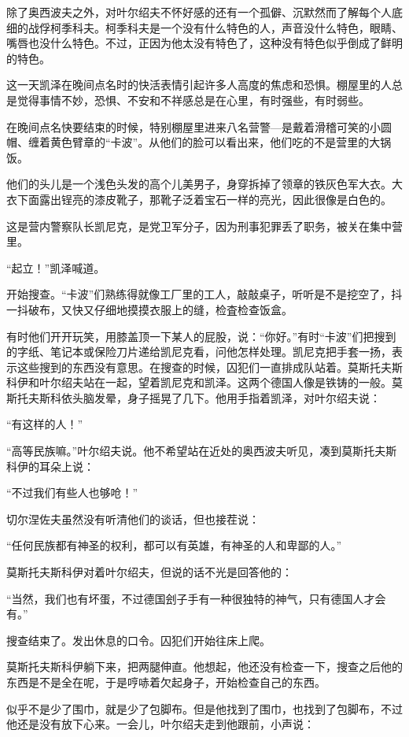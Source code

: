 除了奥西波夫之外，对叶尔绍夫不怀好感的还有一个孤僻、沉默然而了解每个人底细的战俘柯季科夫。柯季科夫是一个没有什么特色的人，声音没什么特色，眼睛、嘴唇也没什么特色。不过，正因为他太没有特色了，这种没有特色似乎倒成了鲜明的特色。

这一天凯泽在晚间点名时的快活表情引起许多人高度的焦虑和恐惧。棚屋里的人总是觉得事情不妙，恐惧、不安和不祥感总是在心里，有时强些，有时弱些。

在晚间点名快要结束的时候，特别棚屋里进来八名营警—是戴着滑稽可笑的小圆帽、缠着黄色臂章的“卡波”。从他们的脸可以看出来，他们吃的不是营里的大锅饭。

他们的头儿是一个浅色头发的高个儿美男子，身穿拆掉了领章的铁灰色军大衣。大衣下面露出锃亮的漆皮靴子，那靴子泛着宝石一样的亮光，因此很像是白色的。

这是营内警察队长凯尼克，是党卫军分子，因为刑事犯罪丢了职务，被关在集中营里。

“起立！”凯泽喊道。

开始搜查。“卡波”们熟练得就像工厂里的工人，敲敲桌子，听听是不是挖空了，抖一抖破布，又快又仔细地摸摸衣服上的缝，检査检查饭盒。

有时他们开开玩笑，用膝盖顶一下某人的屁股，说：“你好。”有时“卡波”们把搜到的字纸、笔记本或保险刀片递给凯尼克看，问他怎样处理。凯尼克把手套一扬，表示这些搜到的东西没有意思。在搜查的时候，囚犯们一直排成队站着。莫斯托夫斯科伊和叶尔绍夫站在一起，望着凯尼克和凯泽。这两个德国人像是铁铸的一般。莫斯托夫斯科依头脑发晕，身子摇晃了几下。他用手指着凯泽，对叶尔绍夫说：

“有这样的人！”

“高等民族嘛。”叶尔绍夫说。他不希望站在近处的奥西波夫听见，凑到莫斯托夫斯科伊的耳朵上说：

“不过我们有些人也够呛！”

切尔涅佐夫虽然没有听清他们的谈话，但也接茬说：

“任何民族都有神圣的权利，都可以有英雄，有神圣的人和卑鄙的人。”

莫斯托夫斯科伊对着叶尔绍夫，但说的话不光是回答他的：

“当然，我们也有坏蛋，不过德国刽子手有一种很独特的神气，只有德国人才会有。”

搜查结束了。发出休息的口令。囚犯们开始往床上爬。

莫斯托夫斯科伊躺下来，把两腿伸直。他想起，他还没有检查一下，搜查之后他的东西是不是全在呢，于是哼哧着欠起身子，开始检查自己的东西。

似乎不是少了围巾，就是少了包脚布。但是他找到了围巾，也找到了包脚布，不过他还是没有放下心来。一会儿，叶尔绍夫走到他跟前，小声说：

